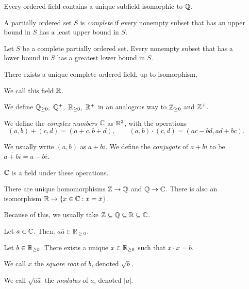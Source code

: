   \begin{prop}
    Every ordered field contains a unique subfield isomorphic to $\mathbb{Q}$.
  \end{prop}
  \begin{defn}
    A partially ordered set $S$ is \emph{complete} if every nonempty subset that has
    an upper bound in $S$ has a least upper bound in $S$.
  \end{defn}
  \begin{prop}
    Let $S$ be a complete partially ordered set. Every nonempty subset that
    has a lower bound in $S$ has a greatest lower bound in $S$.
  \end{prop}
  \begin{thm}
    There exists a unique complete ordered field, up to isomorphism.
  \end{thm}
  \begin{defn}
    We call this field $\mathbb{R}$.
  \end{defn}
  \begin{defn}
    We define $\mathbb{Q}_{\ge 0},\ \mathbb{Q}^+,\ \mathbb{R}_{\ge 0},\ \mathbb{R}^+$ in an analogous way to
    $\mathbb{Z}_{\ge 0}$ and $\mathbb{Z}^+$.
  \end{defn}
  \begin{defn}
    We define the \emph{complex numbers} $\mathbb{C}$ as $\mathbb{R}^2$, with the operations
    \[(a,b)+(c,d)=(a+c,b+d),\qquad (a,b)\cdot(c,d)=(ac-bd,ad+bc).\]

    We usually write $(a,b)$ as $a+bi$. We define the \emph{conjugate} of $a+bi$
    to be $\overline{a+bi}=a-bi$.
  \end{defn}
  \begin{prop}
    $\mathbb{C}$ is a field under these operations.
  \end{prop}
  \begin{prop}
    There are unique homomorphisms $\mathbb{Z}\to\mathbb{Q}$ and $\mathbb{Q}\to\mathbb{C}$.
    There is also an isomorphism $\mathbb{R}\to\{x\in\mathbb{C}: x=\overline x\}$.
  \end{prop}
  \begin{rem}
    Because of this, we usually take $\mathbb{Z}\subseteq\mathbb{Q}\subseteq\mathbb{R}\subseteq\mathbb{C}$.
  \end{rem}
  \begin{prop}
    Let $a\in\mathbb{C}$. Then, $a\overline{a}\in\mathbb R_{\ge 0}$.
  \end{prop}
  \begin{prop}
    Let $b\in\mathbb{R}_{\ge 0}$. There exists a unique $x\in\mathbb{R}_{\ge 0}$ such that
    $x\cdot x=b$. 
  \end{prop}
  \begin{defn}
    We call $x$ the \emph{square root} of $b$, denoted $\sqrt b$.

    We call $\sqrt{a\overline a}$ the \emph{modulus} of $a$, denoted $|a|$.
  \end{defn}
